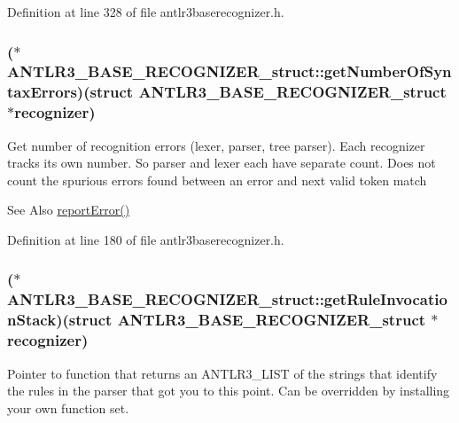 Definition at line 328 of file antlr3baserecognizer.\-h.

\hypertarget{struct_a_n_t_l_r3___b_a_s_e___r_e_c_o_g_n_i_z_e_r__struct_a1f5ee9670652b2e2240bbc59b51b11cc}{
\subsubsection[{get\-Number\-Of\-Syntax\-Errors}]{($\ast$ A\-N\-T\-L\-R3\-\_\-\-B\-A\-S\-E\-\_\-\-R\-E\-C\-O\-G\-N\-I\-Z\-E\-R\-\_\-struct\-::get\-Number\-Of\-Syntax\-Errors)(struct {\bf A\-N\-T\-L\-R3\-\_\-\-B\-A\-S\-E\-\_\-\-R\-E\-C\-O\-G\-N\-I\-Z\-E\-R\-\_\-struct} $\ast${\bf recognizer})}}\label{struct_a_n_t_l_r3___b_a_s_e___r_e_c_o_g_n_i_z_e_r__struct_a1f5ee9670652b2e2240bbc59b51b11cc}
Get number of recognition errors (lexer, parser, tree parser). Each recognizer tracks its own number. So parser and lexer each have separate count. Does not count the spurious errors found between an error and next valid token match

\begin{DoxySeeAlso}{See Also}
\hyperlink{struct_a_n_t_l_r3___b_a_s_e___r_e_c_o_g_n_i_z_e_r__struct_aff75da1adc039c409ea9092e2c03b10c}{report\-Error()} 
\end{DoxySeeAlso}


Definition at line 180 of file antlr3baserecognizer.\-h.

\hypertarget{struct_a_n_t_l_r3___b_a_s_e___r_e_c_o_g_n_i_z_e_r__struct_a48d3824f2a6218c53eda82f4a84cf018}{
\subsubsection[{get\-Rule\-Invocation\-Stack}]{($\ast$ A\-N\-T\-L\-R3\-\_\-\-B\-A\-S\-E\-\_\-\-R\-E\-C\-O\-G\-N\-I\-Z\-E\-R\-\_\-struct\-::get\-Rule\-Invocation\-Stack)(struct {\bf A\-N\-T\-L\-R3\-\_\-\-B\-A\-S\-E\-\_\-\-R\-E\-C\-O\-G\-N\-I\-Z\-E\-R\-\_\-struct} $\ast${\bf recognizer})}}\label{struct_a_n_t_l_r3___b_a_s_e___r_e_c_o_g_n_i_z_e_r__struct_a48d3824f2a6218c53eda82f4a84cf018}
Pointer to function that returns an A\-N\-T\-L\-R3\-\_\-\-L\-I\-S\-T of the strings that identify the rules in the parser that got you to this point. Can be overridden by installing your own function set.

